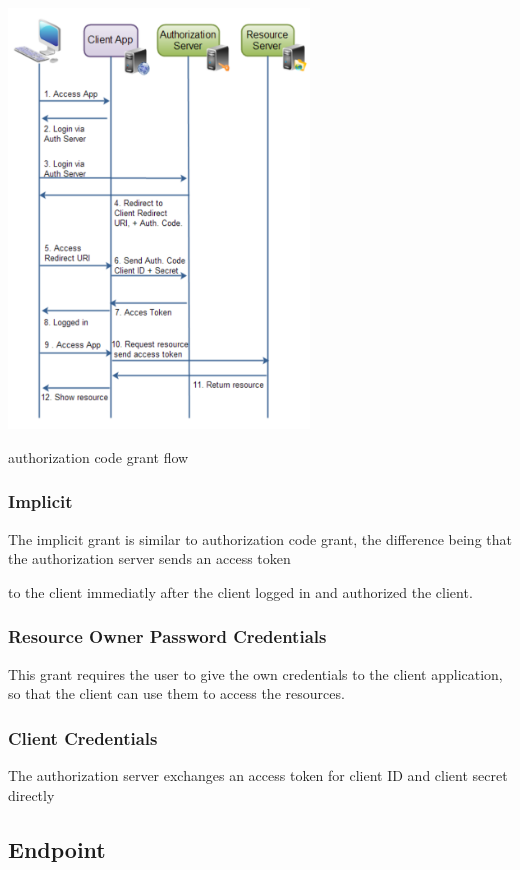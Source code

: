  
\begin{DoxyImage}
\includegraphics[width=8cm]{authorization-auth-code}
\caption{authorization code grant flow}
\end{DoxyImage}
\hypertarget{oauth_implicit}{}\subsubsection{\-Implicit}\label{oauth_implicit}
\-The implicit grant is similar to authorization code grant, the difference being that the authorization server sends an access token \par
 to the client immediatly after the client logged in and authorized the client.\hypertarget{oauth_ropc}{}\subsubsection{\-Resource Owner Password Credentials}\label{oauth_ropc}
\-This grant requires the user to give the own credentials to the client application, so that the client can use them to access the resources.\hypertarget{oauth_cc}{}\subsubsection{\-Client Credentials}\label{oauth_cc}
\-The authorization server exchanges an access token for client \-I\-D and client secret directly\hypertarget{oauth_endpoint}{}\subsection{\-Endpoint}\label{oauth_endpoint}
